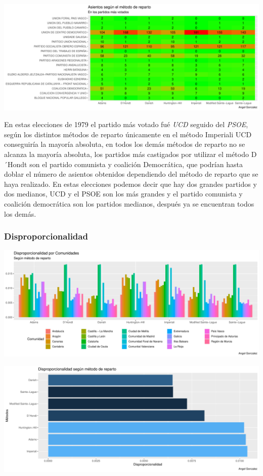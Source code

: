 \documentclass[12pt,a4paper,]{book}
\numberwithin{dummy}{section}
\theoremstyle{ocrenumbox}
\theoremstyle{blacknumex}
\theoremstyle{blacknumbox}
\theoremstyle{ocrenum}
\theoremstyle{ocrenum}
\begin{document}
\begin{center}\includegraphics[width=0.95\linewidth]{figurasR/unnamed-chunk-68-2} \end{center}

En estas elecciones de 1979 el partido más votado fué \emph{UCD} seguido
del \emph{PSOE}, según los distintos métodos de reparto únicamente en el
método Imperiali UCD conseguiría la mayoría absoluta, en todos los demás
métodos de reparto no se alcanza la mayoría absoluta, los partidos más
castigados por utilizar el método D´Hondt son el partido comunista y
coalición Democrática, que podrían hasta doblar el número de asientos
obtenidos dependiendo del método de reparto que se haya realizado. En
estas elecciones podemos decir que hay dos grandes partidos y dos
medianos, UCD y el PSOE son los más grandes y el partido comunista y
coalición democrática son los partidos medianos, después ya se
encuentran todos los demás.

\hypertarget{disproporcionalidad-1}{%
\subsubsection{Disproporcionalidad}\label{disproporcionalidad-1}}

\begin{center}\includegraphics[width=0.95\linewidth]{figurasR/unnamed-chunk-69-1} \end{center}

\begin{center}\includegraphics[width=0.95\linewidth]{figurasR/unnamed-chunk-69-2} \end{center}
\end{document}
